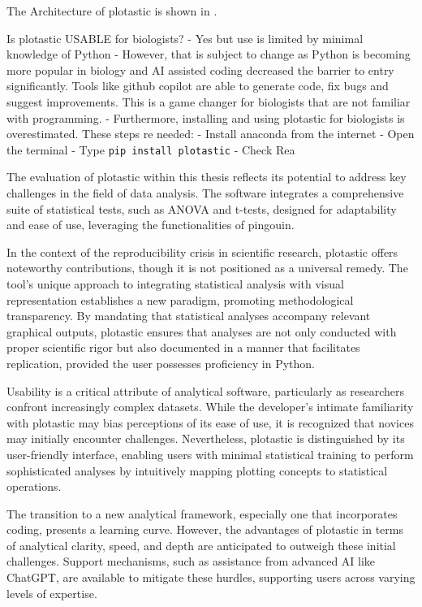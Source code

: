 The Architecture of plotastic is shown in .



Is plotastic USABLE for biologists?
- Yes but use is limited by minimal knowledge of Python
- However, that is subject to change as Python is becoming more popular
in biology and AI assisted coding decreased the barrier to entry
significantly. Tools like github copilot are able to generate code, fix
bugs and suggest improvements. This is a game changer for biologists
that are not familiar with programming.
- Furthermore, installing and using plotastic for biologists is overestimated. These
steps re needed:
- Install anaconda from the internet
- Open the terminal
- Type \texttt{pip install plotastic}
- Check Rea


The evaluation of plotastic within this thesis reflects its potential to address
key challenges in the field of data analysis. The software integrates a
comprehensive suite of statistical tests, such as ANOVA and t-tests, designed
for adaptability and ease of use, leveraging the functionalities of pingouin.

In the context of the reproducibility crisis in scientific research, plotastic
offers noteworthy contributions, though it is not positioned as a universal
remedy. The tool's unique approach to integrating statistical analysis with
visual representation establishes a new paradigm, promoting methodological
transparency. By mandating that statistical analyses accompany relevant
graphical outputs, plotastic ensures that analyses are not only conducted with
proper scientific rigor but also documented in a manner that facilitates
replication, provided the user possesses proficiency in Python.

Usability is a critical attribute of analytical software, particularly as
researchers confront increasingly complex datasets. While the developer's
intimate familiarity with plotastic may bias perceptions of its ease of use, it
is recognized that novices may initially encounter challenges. Nevertheless,
plotastic is distinguished by its user-friendly interface, enabling users with
minimal statistical training to perform sophisticated analyses by intuitively
mapping plotting concepts to statistical operations.

The transition to a new analytical framework, especially one that incorporates
coding, presents a learning curve. However, the advantages of plotastic in terms
of analytical clarity, speed, and depth are anticipated to outweigh these
initial challenges. Support mechanisms, such as assistance from advanced AI like
ChatGPT, are available to mitigate these hurdles, supporting users across
varying levels of expertise.

